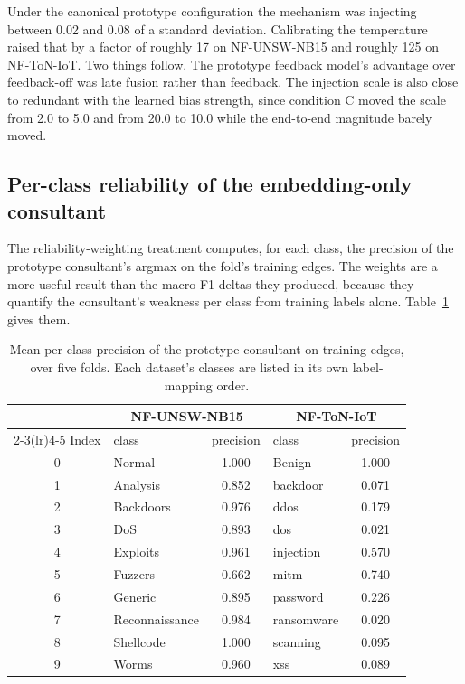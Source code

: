 Under the canonical prototype configuration the mechanism was injecting between 0.02 and 0.08
of a standard deviation. Calibrating the temperature raised that by a factor of roughly 17 on
NF-UNSW-NB15 and roughly 125 on NF-ToN-IoT. Two things follow. The prototype feedback model's advantage
over feedback-off was late fusion rather than feedback. The injection scale is also close to
redundant with the learned bias strength, since condition C moved the scale from 2.0 to 5.0 and
from 20.0 to 10.0 while the end-to-end magnitude barely moved.

\FloatBarrier
\subsection{Per-class reliability of the embedding-only consultant}
\label{app:reliability}

The reliability-weighting treatment computes, for each class, the precision of the prototype
consultant's argmax on the fold's training edges. The weights are a more useful result than
the macro-F1 deltas they produced, because they quantify the consultant's weakness per class
from training labels alone. Table~\ref{tab:reliability} gives them.

\begin{table}[htbp]
\centering
\caption[Prototype precision on training edges]{Mean per-class precision of the prototype consultant on training edges, over five
folds. Each dataset's classes are listed in its own label-mapping order.}
\label{tab:reliability}
\small
\begin{tabular}{clclc}
\toprule
 & \multicolumn{2}{c}{NF-UNSW-NB15} & \multicolumn{2}{c}{NF-ToN-IoT} \\
\cmidrule(lr){2-3}\cmidrule(lr){4-5}
Index & class & precision & class & precision \\
\midrule
0 & Normal         & 1.000 & Benign     & 1.000 \\
1 & Analysis       & 0.852 & backdoor   & 0.071 \\
2 & Backdoors      & 0.976 & ddos       & 0.179 \\
3 & DoS            & 0.893 & dos        & 0.021 \\
4 & Exploits       & 0.961 & injection  & 0.570 \\
5 & Fuzzers        & 0.662 & mitm       & 0.740 \\
6 & Generic        & 0.895 & password   & 0.226 \\
7 & Reconnaissance & 0.984 & ransomware & 0.020 \\
8 & Shellcode      & 1.000 & scanning   & 0.095 \\
9 & Worms          & 0.960 & xss        & 0.089 \\
\bottomrule
\end{tabular}
\end{table}

